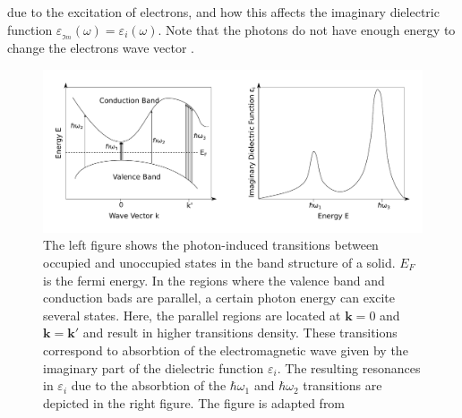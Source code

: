 due to the excitation of electrons, and how this affects the imaginary dielectric function 
$\varepsilon\!_{_{\Im\! m}} \!\! (\omega) = \varepsilon_i(\omega)$. Note that the photons do not have
enough energy to change the electrons wave vector \cite[p.~166-171]{Hofmann}.
%
\begin{figure}[h!]
  \centering
   \includegraphics[width=1.0\textwidth]{Figures/bandstructureVSdielectric.pdf}
   \caption{
      The left figure shows the photon-induced transitions between occupied and unoccupied states in the band 
      structure of a solid. $E_F$ is the fermi energy. 
      In the regions where the valence band and conduction bads are parallel,
      a certain photon energy can excite several states. Here, the parallel regions are located at
      $\boldsymbol k = 0$ and $\boldsymbol k = \boldsymbol k'$ and result in higher transitions density.
      These transitions correspond to absorbtion of the electromagnetic wave given by the imaginary part of
      the dielectric function $\varepsilon_i$. The resulting resonances in $\varepsilon_i$ due to 
      the absorbtion of the $\hbar \omega_1$ and $\hbar \omega_2$ transitions are depicted in the right
      figure. The figure is adapted from \cite[p.~170]{Hofmann}
   }
   \label{fig:transitionResonance}
\end{figure}
%







